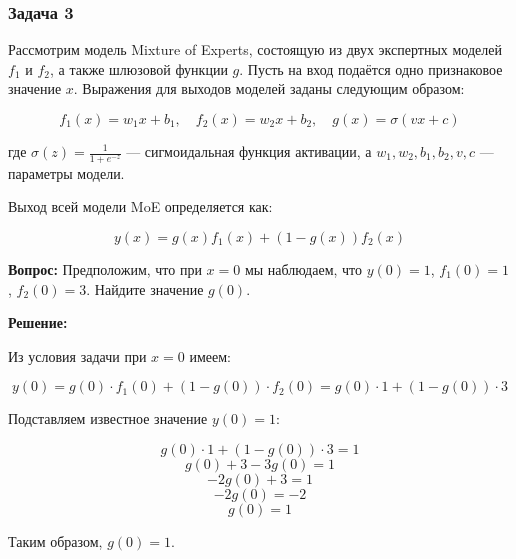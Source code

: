 \subsubsection{Задача 3}

Рассмотрим модель Mixture of Experts, состоящую из двух экспертных моделей $f_1$ и $f_2$, а также шлюзовой функции $g$. Пусть на вход подаётся одно признаковое значение $x$. Выражения для выходов моделей заданы следующим образом:

$$
f_1(x) = w_1 x + b_1, \quad f_2(x) = w_2 x + b_2, \quad g(x) = \sigma(v x + c)
$$

где $\sigma(z) = \frac{1}{1 + e^{-z}}$ — сигмоидальная функция активации, а $w_1, w_2, b_1, b_2, v, c$ — параметры модели.

Выход всей модели MoE определяется как:

$$
y(x) = g(x) f_1(x) + (1 - g(x)) f_2(x)
$$

\textbf{Вопрос:} Предположим, что при $x = 0$ мы наблюдаем, что $y(0) = 1$, $f_1(0) = 1$, $f_2(0) = 3$. Найдите значение $g(0)$.

\textbf{Решение:}

Из условия задачи при $x = 0$ имеем:

$$
y(0) = g(0) \cdot f_1(0) + (1 - g(0)) \cdot f_2(0) = g(0) \cdot 1 + (1 - g(0)) \cdot 3
$$

Подставляем известное значение $y(0) = 1$:

$$
g(0) \cdot 1 + (1 - g(0)) \cdot 3 = 1
$$
$$
g(0) + 3 - 3g(0) = 1
$$
$$
-2g(0) + 3 = 1
$$
$$
-2g(0) = -2
$$
$$
g(0) = 1
$$

Таким образом, $g(0) = 1$.
